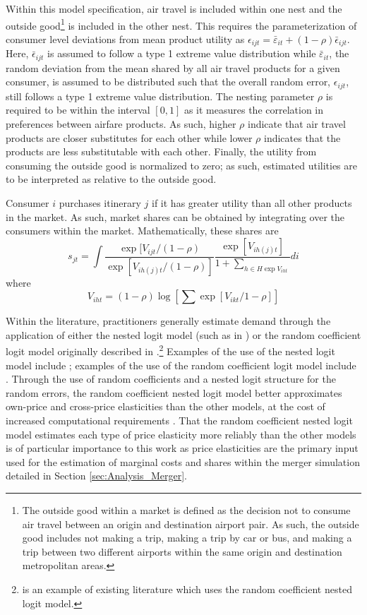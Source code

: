\documentclass{article}
\begin{document}
    Within this model specification, air travel is included within one nest and the outside good\footnote{The outside good within a market is defined as the decision not to consume air travel between an origin and destination airport pair. As such, the outside good includes not making a trip, making a trip by car or bus, and making a trip between two different airports within the same origin and destination metropolitan areas.} is included in the other nest. This requires the parameterization of consumer level deviations from mean product utility as $\epsilon_{ijt} = \bar{\varepsilon}_{it} + (1-\rho) \bar{\epsilon}_{ijt}$. Here, $\bar{\epsilon}_{ijt}$ is assumed to follow a type 1 extreme value distribution while $\bar{\varepsilon}_{it}$,  the random deviation from the mean shared by all air travel products for a given consumer, is assumed to be distributed such that the overall random error, $\epsilon_{ijt}$, still follows a type 1 extreme value distribution. The nesting parameter $\rho$ is required to be within the interval $[0,1]$ as it measures the correlation in preferences between airfare products. As such, higher $\rho$ indicate that air travel products are closer substitutes for each other while lower $\rho$ indicates that the products are less substitutable with each other. Finally, the utility from consuming the outside good is normalized to zero; as such, estimated utilities are to be interpreted as relative to the outside good.
	
	Consumer $i$ purchases itinerary $j$ if it has greater utility than all other products in the market. As such, market shares can be obtained by integrating over the consumers within the market. Mathematically, these shares are \[s_{jt} = \int \frac{\exp[V_{ijt} / (1-\rho)}{\exp [V_{i h(j) t} / (1 - \rho)]} \frac{\exp[V_{ih(j)t}]}{1 + \sum_{h \in H \exp V_{iht}}} d{{i}}\] where \[V_{iht} = (1 - \rho) \log\left[\sum \exp[V_{ikt} / 1 - \rho]\right] \] 

    Within the literature, practitioners generally estimate demand through the application of either the nested logit model (such as in \citet{turner_access_2022,ciliberto_market_2021, aguirregabiria_dynamic_2012}) or the random coefficient logit model originally described in \citet{berry_automobile_1995}.\footnote{\citet{bet_market_2021} is an example of existing literature which uses the random coefficient nested logit model.} Examples of the use of the nested logit model include   \citet{turner_access_2022,ciliberto_market_2021, aguirregabiria_dynamic_2012}; examples of the use of the random coefficient logit model include \citet{ gayle_efficiency_2013, berry_tracing_2010}. Through the use of random coefficients and a nested logit structure for the random errors, the random coefficient nested logit model better approximates own-price and cross-price elasticities than the other models, at the cost of increased computational requirements \citep{grigolon_nested_2014}. That the random coefficient nested logit model estimates each type of price elasticity more reliably than the other models is of particular importance to this work as price elasticities are the primary input used for the estimation of marginal costs and shares within the merger simulation detailed in Section \ref{sec:Analysis_Merger}. 
	
\end{document}

